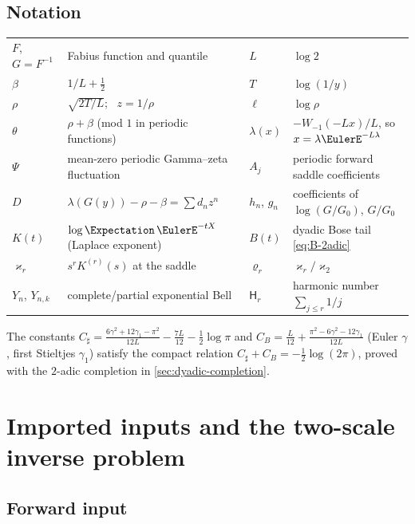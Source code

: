 \documentclass[11pt,oneside]{article}
\numberwithin{equation}{section}
\theoremstyle{definition}
\theoremstyle{remark}
\newcommand{\LambertW}{W}
\newcommand{\Bell}{Y}
\newcommand{\Csharp}{C_{\sharp}}
\newcommand{\CB}{C_{B}}
\newcommand{\Gzero}{G_0}
\newcommand{\Hnum}{\mathsf H}
\begin{document}
\subsection*{Notation}

\begin{center}
\small
\begin{tabular}{@{}llll@{}}
\toprule
$F$, $G=F^{-1}$ & Fabius function and quantile &
$L$ & $\log2$\\
$\beta$ & $1/L+\tfrac12$ &
$T$ & $\log(1/y)$\\
$\rho$ & $\sqrt{2T/L}$; \ $z=1/\rho$ &
$\ell$ & $\log\rho$\\
$\theta$ & $\rho+\beta$ (mod $1$ in periodic functions) &
$\lambda(x)$ & $-\LambertW_{-1}(-Lx)/L$, so $x=\lambda\EulerE^{-L\lambda}$\\
$\Psi$ & mean-zero periodic Gamma--zeta fluctuation &
$A_j$ & periodic forward saddle coefficients\\
$D$ & $\lambda(G(y))-\rho-\beta=\sum d_nz^{n}$ &
$h_n$, $g_n$ & coefficients of $\log(G/\Gzero)$, $G/\Gzero$\\
$K(t)$ & $\log\Expectation\,\EulerE^{-tX}$ (Laplace exponent) &
$B(t)$ & dyadic Bose tail \eqref{eq:B-2adic}\\
$\varkappa_r$ & $s^{r}K^{(r)}(s)$ at the saddle &
$\varrho_r$ & $\varkappa_r/\varkappa_2$\\
$\Bell_n$, $\Bell_{n,k}$ & complete/partial exponential Bell &
$\Hnum_r$ & harmonic number $\sum_{j\le r}1/j$\\
\bottomrule
\end{tabular}
\end{center}
The constants
$\Csharp=\frac{6\gamma^{2}+12\gamma_1-\pi^{2}}{12L}
-\frac{7L}{12}-\frac12\log\pi$ and
$\CB=\frac{L}{12}+\frac{\pi^{2}-6\gamma^{2}-12\gamma_1}{12L}$
(Euler $\gamma$, first Stieltjes $\gamma_1$) satisfy the compact
relation $\Csharp+\CB=-\tfrac12\log(2\pi)$, proved with the
$2$-adic completion in \cref{sec:dyadic-completion}.

\section{Imported inputs and the two-scale inverse problem}
\label{sec:inputs}

\subsection{Forward input}
\end{document}
